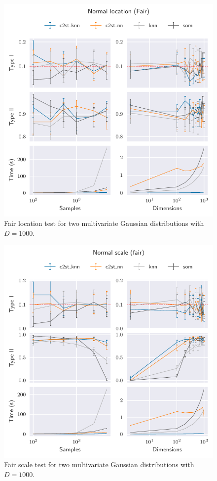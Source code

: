 \begin{figure}[htbp]
    \centering
    \includegraphics{images/6_som/normal_location_fair}
    \caption[Fair location test for two multivariate Gaussian distributions.]{
    Fair location test for two multivariate Gaussian distributions with $D=1000$.}
    \label{fig:normal_fair_location}
\end{figure}



\begin{figure}[htbp]
    \centering
    \includegraphics{images/6_som/normal_scale_fair}
    \caption[Fair scale test for two multivariate Gaussian distributions.]{
    Fair scale test for two multivariate Gaussian distributions with $D=1000$.}
    \label{fig:normal_fair_scale}
\end{figure}

